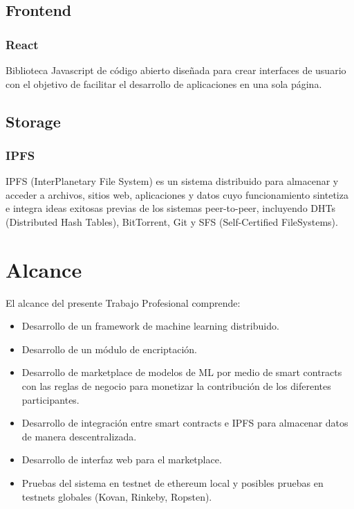 \documentclass[
11pt, %
oneside, %
spanish, %
singlespacing, %
headsepline, %
chapterinoneline, %
]{MastersDoctoralThesis} %
\begin{document}
\section{Frontend}

\subsection{React \cite{rt}}
Biblioteca Javascript de código abierto diseñada para crear interfaces de usuario con el objetivo de facilitar el desarrollo de aplicaciones en una sola página. 

\section{Storage}

\subsection{IPFS \cite{ipfs}}
IPFS (InterPlanetary File System) es un sistema distribuido para almacenar y acceder a archivos, sitios web, aplicaciones y datos cuyo funcionamiento sintetiza e integra ideas exitosas previas de los sistemas peer-to-peer, incluyendo DHTs (Distributed Hash Tables),  BitTorrent, Git y SFS (Self-Certified FileSystems).

\chapter{Alcance}
El alcance del presente Trabajo Profesional comprende:

\begin{itemize}
\item Desarrollo de un framework de machine learning distribuido.
\item Desarrollo de un módulo de encriptación.
\item Desarrollo de marketplace de modelos de ML por medio de smart contracts con las reglas de negocio para monetizar la contribución de los diferentes participantes.
\item Desarrollo de integración entre smart contracts e IPFS para almacenar datos de manera descentralizada.
\item Desarrollo de interfaz web para el marketplace.
\item Pruebas del sistema en testnet de ethereum local y posibles pruebas en testnets globales (Kovan, Rinkeby, Ropsten).
\end{itemize}
\end{document}
